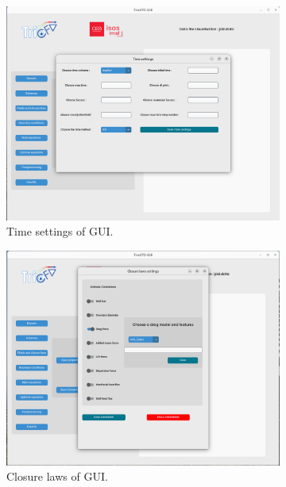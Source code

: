 \begin{figure}[htbp] 
\centering 
\begin{subfigure}[b]{0.45\textwidth} 
\centering 
\includegraphics[scale=0.2]{Figure/Guitime.png} 
\caption{Time settings of GUI.}  
\end{subfigure} 
\hfill 
\begin{subfigure}[b]{0.45\textwidth} 
\centering 
\includegraphics[scale=0.2]{Figure/Guicorrel.png} 
\caption{Closure laws of GUI.} 
 \end{subfigure} \\[1ex] 
\begin{subfigure}[b]{0.45\textwidth} 

\end{subfigure}
\end{figure}
